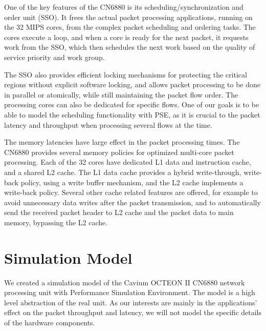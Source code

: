 One of the key features of the CN6880 is its scheduling/synchronization and order unit (SSO). It frees the actual packet processing applications, running on the 32 MIPS cores, from the complex packet scheduling and ordering tasks. The cores execute a loop, and when a core is ready for the next packet, it requests work from the SSO, which then schedules the next work based on the quality of service priority and work group.~\cite{Cavium FUNDAMENTALS}

The SSO also provides efficient locking mechanisms for protecting the critical regions without explicit software locking, and allows packet processing to be done in parallel or atomically, while still maintaining the packet flow order. The processing cores can also be dedicated for specific flows. One of our goals is to be able to model the scheduling functionality with PSE, as it is crucial to the packet latency and throughput when processing several flows at the time.~\cite{Cavium FUNDAMENTALS}

The memory latencies have large effect in the packet processing times. The CN6880 provides several memory policies for optimized multi-core packet processing. Each of the 32 cores have dedicated L1 data and instruction cache, and a shared L2 cache. The L1 data cache provides a hybrid write-through, write-back policy, using a write buffer mechanism, and the L2 cache implements a write-back policy. Several other cache related features are offered, for example to avoid unnecessary data writes after the packet transmission, and to automatically send the received packet header to L2 cache and the packet data to main memory, bypassing the L2 cache.~\cite{Cavium FUNDAMENTALS}

\section{Simulation Model}
\label{sec:simulation-model}

We created a simulation model of the Cavium OCTEON II CN6880 network processing unit with Performance Simulation Environment. The model is a high level abstraction of the real unit. As our interests are mainly in the applications' effect on the packet throughput and latency, we will not model the specific details of the hardware components.

